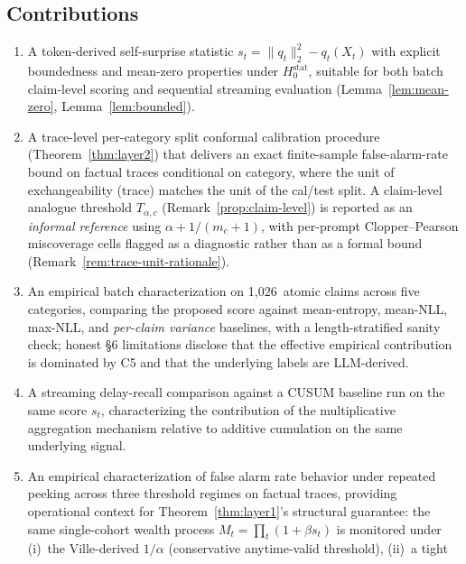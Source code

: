 \documentclass[runningheads]{llncs}
\newcommand{\Hnull}{H_0^{\text{stat}}}
\begin{document}
\subsection{Contributions}
\begin{enumerate}
    \item A token-derived self-surprise statistic
          $s_t = \|q_t\|_2^2 - q_t(X_t)$ with explicit boundedness and
          mean-zero properties under $\Hnull$, suitable for both batch
          claim-level scoring and sequential streaming evaluation
          (Lemma~\ref{lem:mean-zero}, Lemma~\ref{lem:bounded}).
    \item A trace-level per-category split conformal calibration
          procedure (Theorem~\ref{thm:layer2}) that delivers an exact
          finite-sample false-alarm-rate bound on factual traces
          conditional on category, where the unit of exchangeability
          (trace) matches the unit of the cal/test split. A claim-level
          analogue threshold $T_{\alpha,c}$ (Remark~\ref{prop:claim-level})
          is reported as an \emph{informal reference} using
          $\alpha + 1/(m_c+1)$, with per-prompt Clopper--Pearson
          miscoverage cells flagged as a diagnostic rather than as a
          formal bound (Remark~\ref{rem:trace-unit-rationale}).
    \item An empirical batch characterization on 1{,}026~atomic claims
          across five categories, comparing the proposed score against
          mean-entropy, mean-NLL, max-NLL, and \emph{per-claim variance}
          baselines, with a length-stratified sanity check; honest
          §6 limitations disclose that the effective empirical
          contribution is dominated by C5 and that the underlying
          labels are LLM-derived.
    \item A streaming delay-recall comparison against a CUSUM baseline
          run on the same score $s_t$, characterizing the contribution
          of the multiplicative aggregation mechanism relative to
          additive cumulation on the same underlying signal.
    \item An empirical characterization of false alarm rate behavior
          under repeated peeking across three threshold regimes on
          factual traces, providing operational context for
          Theorem~\ref{thm:layer1}'s structural guarantee: the same
          single-cohort wealth process $M_t = \prod_t(1 + \beta s_t)$
          is monitored under (i)~the Ville-derived $1/\alpha$
          (conservative anytime-valid threshold), (ii)~a tight

\end{enumerate}
\end{document}
